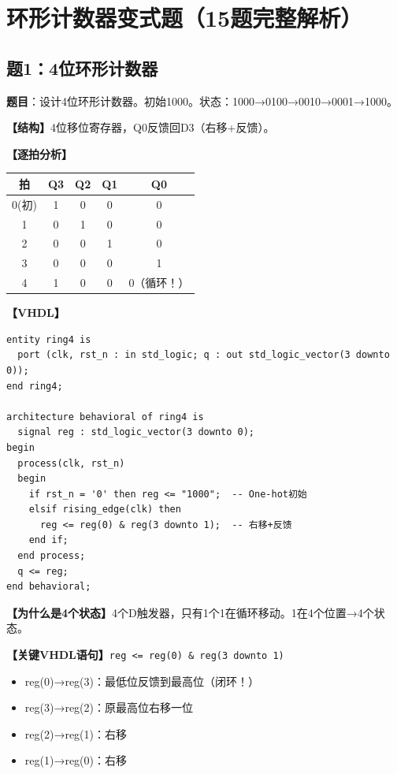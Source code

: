 \chapter{环形计数器变式题（15题完整解析）}

\section{题1：4位环形计数器}

\textbf{题目}：设计4位环形计数器。初始1000。状态：1000→0100→0010→0001→1000。

\begin{solution}[完整解答]

\textbf{【结构】}4位移位寄存器，Q0反馈回D3（右移+反馈）。

\textbf{【逐拍分析】}
\begin{center}
\begin{tabular}{|c|c|c|c|c|}\hline
拍 & Q3 & Q2 & Q1 & Q0 \\ \hline
0(初) & 1 & 0 & 0 & 0 \\ \hline
1 & 0 & 1 & 0 & 0 \\ \hline
2 & 0 & 0 & 1 & 0 \\ \hline
3 & 0 & 0 & 0 & 1 \\ \hline
4 & 1 & 0 & 0 & 0（循环！）\\ \hline
\end{tabular}
\end{center}

\textbf{【VHDL】}
\begin{lstlisting}
entity ring4 is
  port (clk, rst_n : in std_logic; q : out std_logic_vector(3 downto 0));
end ring4;

architecture behavioral of ring4 is
  signal reg : std_logic_vector(3 downto 0);
begin
  process(clk, rst_n)
  begin
    if rst_n = '0' then reg <= "1000";  -- One-hot初始
    elsif rising_edge(clk) then
      reg <= reg(0) & reg(3 downto 1);  -- 右移+反馈
    end if;
  end process;
  q <= reg;
end behavioral;
\end{lstlisting}

\textbf{【为什么是4个状态】}4个D触发器，只有1个1在循环移动。1在4个位置→4个状态。

\textbf{【关键VHDL语句】}\texttt{reg <= reg(0) \& reg(3 downto 1)}
\begin{itemize}
  \item reg(0)→reg(3)：最低位反馈到最高位（闭环！）
  \item reg(3)→reg(2)：原最高位右移一位
  \item reg(2)→reg(1)：右移
  \item reg(1)→reg(0)：右移
\end{itemize}

\end{solution}


